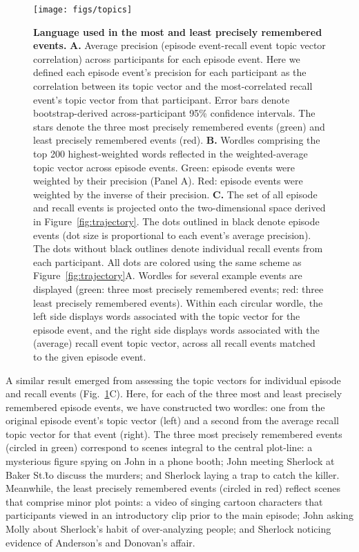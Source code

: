 \documentclass[10pt]{article}
\begin{document}
\begin{figure}[tp]
\centering
\texttt{[image: figs/topics]}
\caption{\small \textbf{Language used in the most and least precisely remembered events.} \textbf{A.} Average precision (episode event-recall event topic vector correlation) across participants for each episode event.  Here we defined each episode event's precision for each participant as the correlation between its topic vector and the most-correlated recall event's topic vector from that participant.  Error bars denote bootstrap-derived across-participant 95\% confidence intervals.  The stars denote the three most precisely remembered events (green) and least precisely remembered events (red).  \textbf{B.} Wordles comprising the top 200 highest-weighted words reflected in the weighted-average topic vector across episode events.  Green: episode events were weighted by their precision (Panel A).  Red: episode events were weighted by the inverse of their precision.  \textbf{C.}  The set of all episode and recall events is projected onto the two-dimensional space derived in Figure~\ref{fig:trajectory}.  The dots outlined in black denote episode events (dot size is proportional to each event's average precision).  The dots without black outlines denote individual recall events from each participant.  All dots are colored using the same scheme as Figure~\ref{fig:trajectory}A.  Wordles for several example events are displayed (green: three most precisely remembered events; red: three least precisely remembered events).  Within each circular wordle, the left side displays words associated with the topic vector for the episode event, and the right side displays words associated with the (average) recall event topic vector, across all recall events matched to the given episode event.}
\label{fig:topics}
\end{figure}

A similar result emerged from assessing the topic vectors for individual episode and recall events (Fig.~\ref{fig:topics}C).  Here, for each of the three most and least precisely remembered episode events, we have constructed two wordles: one from the original episode event's topic vector (left) and a second from the average recall topic vector for that event (right).  The three most precisely remembered events (circled in green) correspond to scenes integral to the central plot-line: a mysterious figure spying on John in a phone booth; John meeting Sherlock at Baker St.\~to discuss the murders; and Sherlock laying a trap to catch the killer.  Meanwhile, the least precisely remembered events (circled in red) reflect scenes that comprise minor plot points: a video of singing cartoon characters that participants viewed in an introductory clip prior to the main episode; John asking Molly about Sherlock's habit of over-analyzing people; and Sherlock noticing evidence of Anderson's and Donovan's affair.
\end{document}
